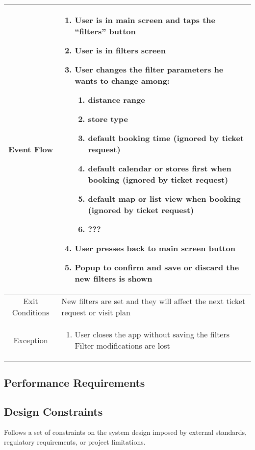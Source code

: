 \begin{enumerate}
\begin{table}[H]
{\begin{tabular}{|c|p{14cm}|}
			Event Flow & \begin{enumerate}
				\item User is in main screen and taps the “filters” button
				\item User is in filters screen
				\item User changes the filter parameters he wants to change among:
				\begin{enumerate}
					\item distance range
					\item store type
					\item default booking time (ignored by ticket request)
					\item default calendar or stores first when booking (ignored by ticket request)
					\item default map or list view when booking (ignored by ticket request)
					\item ???
				\end{enumerate}
				
				\item User presses back to main screen button
				\item Popup to confirm and save or discard the new filters is shown 
				
			\end{enumerate}\\
			
			\hline
			Exit Conditions & New filters are set and they will affect the next ticket request or visit plan\\
			\hline
			
			Exception & \begin{enumerate}
				\item User closes the app without saving the filters\newline
				Filter modifications are lost
				
			\end{enumerate}\\
			
			\hline
		\end{tabular}
	}
\end{table}


\end{enumerate}
\subsection{Performance Requirements}

\subsection{Design Constraints}
Follows a set of constraints on the system design imposed by external standards, regulatory requirements, or project
limitations.

